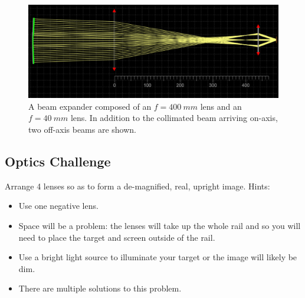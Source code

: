 \documentclass[a4paper]{report}
\begin{document}
\begin{figure}[h]
\center
\includegraphics[width=4.5in]{telescope_ray_diag.eps}
\caption{A beam expander composed of an $f=400~mm$ lens and an $f=40~mm$ lens. 
In addition to the collimated beam arriving on-axis, two off-axis beams are shown.}
\label{fig:telescope}
\end{figure}

\clearpage


\subsection{Optics Challenge}
Arrange 4 lenses so as to form a de-magnified, real, upright image. Hints: 
\begin{itemize}
\item Use one negative lens.
\item Space will be a problem: the lenses will take up the whole rail and so you will need to place the target and screen outside of the rail.
\item Use a bright light source to illuminate your target or the image will likely be dim. 
\item There are multiple solutions to this problem.
\end{itemize}

\clearpage
\end{document}
